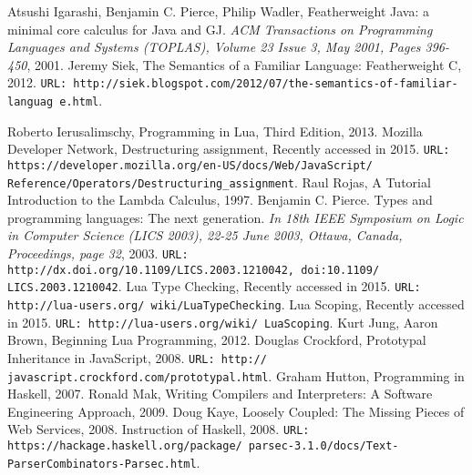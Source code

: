 \begin{thebibliography}{10}
	Atsushi Igarashi, Benjamin C. Pierce, Philip Wadler, Featherweight Java: a minimal core calculus for Java and GJ. {\it ACM Transactions on Programming Languages and Systems (TOPLAS), Volume 23 Issue 3, May 2001, Pages 396-450}, 2001.
Jeremy Siek, The Semantics of a Familiar Language: Featherweight C, 2012. 
{\tt URL: http://siek.blogspot.com/2012/07/the-semantics-of-familiar-languag
e.html}.


 Roberto Ierusalimschy, Programming in Lua, Third Edition,  2013.
 Mozilla Developer Network, Destructuring assignment, Recently accessed in 2015. {\tt URL: https://developer.mozilla.org/en-US/docs/Web/JavaScript/
Reference/Operators/Destructuring\_assignment}.
 Raul Rojas, A Tutorial Introduction to the Lambda Calculus, 1997.
 Benjamin C. Pierce. Types and programming languages: The next generation. {\it In 18th IEEE Symposium on Logic in Computer Science (LICS 2003), 22-25 June 2003, Ottawa, Canada, Proceedings, page 32}, 2003. {\tt URL: http://dx.doi.org/10.1109/LICS.2003.1210042, doi:10.1109/ LICS.2003.1210042}.
 Lua Type Checking, Recently accessed in 2015. {\tt URL: http://lua-users.org/
wiki/LuaTypeChecking}.
 Lua Scoping, Recently accessed in 2015. {\tt URL: http://lua-users.org/wiki/
LuaScoping}.
 Kurt Jung, Aaron Brown, Beginning Lua Programming, 2012.
 Douglas Crockford, Prototypal Inheritance in JavaScript, 2008. {\tt URL: http://
javascript.crockford.com/prototypal.html}.
 Graham Hutton, Programming in Haskell, 2007.
 Ronald Mak, Writing Compilers and Interpreters: A Software Engineering Approach, 2009.
 Doug Kaye, Loosely Coupled: The Missing Pieces of Web Services, 2008.
 Instruction of Haskell, 2008. {\tt URL: https://hackage.haskell.org/package/
parsec-3.1.0/docs/Text-ParserCombinators-Parsec.html}.
\\

\end{thebibliography}
